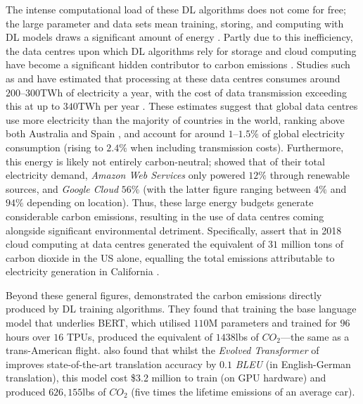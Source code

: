 \documentclass[a4paper, 11pt]{report}
\begin{document}
    The intense computational load of these DL algorithms does not come for free; the large parameter and data sets mean training, storing, and computing with DL models draws a significant amount of energy \citep{bietti-2019}. Partly due to this inefficiency, the data centres upon which DL algorithms rely for storage and cloud computing have become a significant hidden contributor to carbon emissions \citep{aljarrah-2015}. Studies such as \citet{masanet-2020} and \citet{malmodin-2018} have estimated that processing at these data centres consumes around $200\text{--}300$TWh of electricity a year, with the cost of data transmission exceeding this at up to $340$TWh per year \citep{iea-2022}. These estimates suggest that global data centres use more electricity than the majority of countries in the world, ranking above both Australia and Spain \citep{eia-2019}, and account for around $1\text{--}1.5\%$ of global electricity consumption (rising to $2.4\%$ when including transmission costs). Furthermore, this energy is likely not entirely carbon-neutral; \citet{cook-2017} showed that of their total electricity demand, \emph{Amazon Web Services} only powered $12\%$ through renewable sources, and \emph{Google Cloud} $56\%$ (with the latter figure ranging between $4\%$ and $94\%$ depending on location). Thus, these large energy budgets generate considerable carbon emissions, resulting in the use of data centres coming alongside significant environmental detriment. Specifically, \citet{hockstad-2018} assert that in 2018 cloud computing at data centres generated the equivalent of $31$ million tons of carbon dioxide in the US alone, equalling the total emissions attributable to electricity generation in California \citep{iea-2022}.
    
    Beyond these general figures, \citet{strubell-2019} demonstrated the carbon emissions directly produced by DL training algorithms. They found that training the base language model that underlies BERT, which utilised $110$M parameters and trained for $96$ hours over $16$ TPUs, produced the equivalent of $1438$lbs of $CO_2$---the same as a trans-American flight. \citeauthor{strubell-2019} also found that whilst the \emph{Evolved Transformer} of \citet{so-2019} improves state-of-the-art translation accuracy by $0.1$ \emph{BLEU} (in English-German translation), this model cost \$3.2 million to train (on GPU hardware) and produced $626,155$lbs of $CO_2$ (five times the lifetime emissions of an average car).
\end{document}
